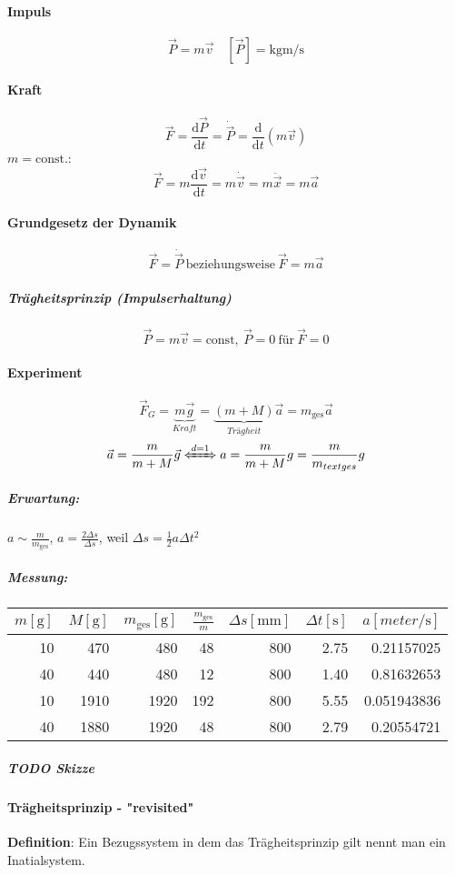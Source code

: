 \documentclass[a4paper]{scrartcl}
\renewcommand{\d}{\mathrm{d}}
\newcommand{\f}[2]{{\frac{#1}{#2}}}
\renewcommand{\v}[1]{\vec{#1}}
\begin{document}
\paragraph{Impuls}
\label{sec-7-2-1-1}
\[\v P = m\v v\quad [\v P] = \si{\kg\meter\per\second}\]
\paragraph{Kraft}
\label{sec-7-2-1-2}
\[\v F = \f{\d\v P}{\d t} = \dot{\v P} = \f{\d}{\d t}(m\v v)\]
$m = \text{const.}$:
\[\v F = m \f{\d\v v}{\d t} = m\dot{\v v} = m\ddot{\v x} = m\v a\]
\paragraph{Grundgesetz der Dynamik}
\label{sec-7-2-1-3}
\[\v F = \dot{\v P}~\text{beziehungsweise}~\v F = m\v a\]
\subparagraph{Trägheitsprinzip (Impulserhaltung)}
\label{sec-7-2-1-3-1}
\[\v P = m\v v = \text{const},~\v P = 0~\text{für}~\v F = 0\]
\paragraph{Experiment}
\label{sec-7-2-1-4}
\[\v F_G = \underbrace{m\v g}_{Kraft} = \underbrace{(m + M)}_{Trägheit}\v a = m_{\text{ges}}\v a\]
\[\v a = \f{m}{m + M}\v g \xLeftrightarrow{d = 1} a = \f{m}{m + M}g = \f{m}{m_{text{ges}}}g\]
\subparagraph{Erwartung:}
\label{sec-7-2-1-4-1}
$a\sim {\f{m}{m_{\text{ges}}}}$, $a = \f{2\Delta s}{\Delta s}$, weil $\Delta s = \f{1}{2} a\Delta t^2$
\subparagraph{Messung:}
\label{sec-7-2-1-4-2}
\begin{center}
\begin{tabular}{rrrrrrr}
$m[\si{\gram}]$ & $M[\si{\gram}]$ & $m_{\text{ges}}[\si{\gram}]$ & $\f{m_{\text{ges}}}{m}$ & $\Delta s[\si{\mm}]$ & $\Delta t [\si{\second}]$ & $a[\si{meter\per\second}]$\\
\hline
10 & 470 & 480 & 48 & 800 & 2.75 & 0.21157025\\
40 & 440 & 480 & 12 & 800 & 1.40 & 0.81632653\\
10 & 1910 & 1920 & 192 & 800 & 5.55 & 0.051943836\\
40 & 1880 & 1920 & 48 & 800 & 2.79 & 0.20554721\\
\end{tabular}
\end{center}
\subparagraph{{\bfseries\sffamily TODO} Skizze}
\label{sec-7-2-1-4-3}
\paragraph{Trägheitsprinzip - "revisited"}
\label{sec-7-2-1-5}
\textbf{Definition}: Ein Bezugssystem in dem das Trägheitsprinzip gilt nennt man ein Inatialsystem. \\
\end{document}
